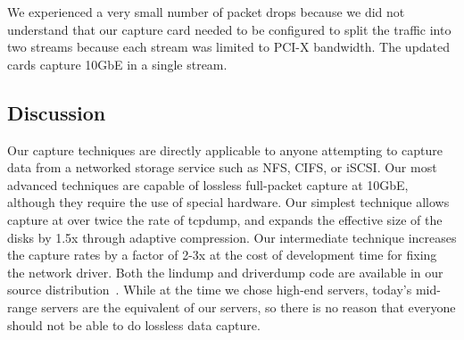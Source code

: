 We experienced a very small number of packet drops because we did not
understand that our capture card needed to be configured to split the
traffic into two streams because each stream was limited to PCI-X
bandwidth.  The updated cards capture 10GbE in a single stream.

\subsection{Discussion}

Our capture techniques are directly applicable to anyone attempting to
capture data from a networked storage service such as NFS, CIFS, or
iSCSI.  Our most advanced techniques are capable of lossless
full-packet capture at 10GbE, although they require the use of special
hardware.  Our simplest technique allows capture at over twice the
rate of tcpdump, and expands the effective size of the disks by 1.5x
through adaptive compression. Our intermediate technique increases the
capture rates by a factor of 2-3x at the cost of development time for
fixing the network driver.  Both the lindump and driverdump code are
available in our source distribution~\cite{DSOpenSource}.  While at
the time we chose high-end servers, today's mid-range servers are the
equivalent of our servers, so there is no reason that everyone should
not be able to do lossless data capture.


